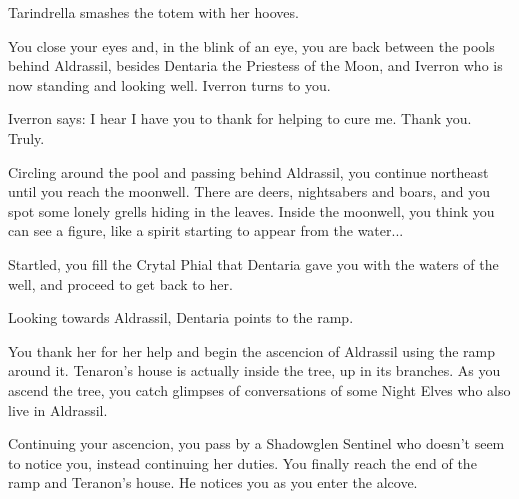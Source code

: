 Tarindrella smashes the totem with her hooves.


You close your eyes and, in the blink of an eye, you are back between the pools behind Aldrassil, besides Dentaria the Priestess of the Moon, and Iverron who is now standing and looking well. Iverron turns to you.


Iverron says: I hear I have you to thank for helping to cure me. Thank you. Truly.




Circling around the pool and passing behind Aldrassil, you continue northeast until you reach the moonwell. There are deers, nightsabers and boars, and you spot some lonely grells hiding in the leaves. Inside the moonwell, you think you can see a figure, like a spirit starting to appear from the water...


Startled, you fill the Crytal Phial that Dentaria gave you with the waters of the well, and proceed to get back to her.




Looking towards Aldrassil, Dentaria points to the ramp.


You thank her for her help and begin the ascencion of Aldrassil using the ramp around it. Tenaron's house is actually inside the tree, up in its branches. As you ascend the tree, you catch glimpses of conversations of some Night Elves who also live in Aldrassil.


Continuing your ascencion, you pass by a Shadowglen Sentinel who doesn't seem to notice you, instead continuing her duties. You finally reach the end of the ramp and Teranon's house. He notices you as you enter the alcove.

